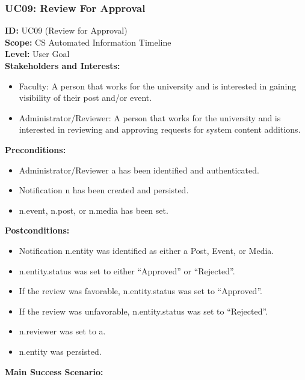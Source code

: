 \documentclass{article}
\begin{document}
\subsubsection{UC09: Review For Approval}
\textbf{ID:} UC09 (Review for Approval) \\
\textbf{Scope:} CS Automated Information Timeline \\
\textbf{Level:} User Goal \\
\textbf{Stakeholders and Interests:}
\begin{itemize}
    \item Faculty: A person that works for the university and is interested in gaining visibility of their post and/or event.
    \item Administrator/Reviewer: A person that works for the university and is interested in reviewing and approving requests for system content additions.
\end{itemize}
\textbf{Preconditions:}
\begin{itemize}
    \item Administrator/Reviewer a has been identified and authenticated.
    \item Notification n has been created and persisted.
    \item n.event, n.post, or n.media has been set.
\end{itemize}
\textbf{Postconditions:}
\begin{itemize}
    \item Notification n.entity was identified as either a Post, Event, or Media.
    \item n.entity.status was set to either “Approved” or “Rejected”.
    \item If the review was favorable, n.entity.status was set to “Approved”.
    \item If the review was unfavorable, n.entity.status was set to “Rejected”.
    \item n.reviewer was set to a.
    \item n.entity was persisted.
\end{itemize}
\textbf{Main Success Scenario:}
\end{document}
